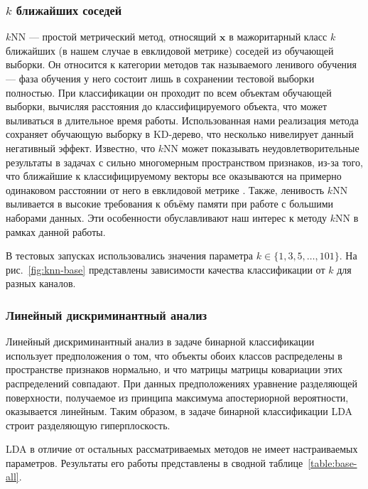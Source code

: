 \subsubsection{\(k\) ближайших соседей}
\(k\)NN --- простой метрический метод, относящий \(\mathbf{x}\) в мажоритарный класс \(k\) ближайших (в нашем случае в евклидовой метрике) соседей из обучающей выборки. Он относится к категории методов так называемого ленивого обучения --- фаза обучения у него состоит лишь в сохранении тестовой выборки полностью. При классификации он проходит по всем объектам обучающей выборки, вычисляя расстояния до классифицируемого объекта, что может выливаться в длительное время работы. Использованная нами реализация метода сохраняет обучающую выборку в KD-дерево, что несколько нивелирует данный негативный эффект. Известно, что \(k\)NN может показывать неудовлетворительные результаты в задачах с сильно многомерным пространством признаков, из-за того, что ближайшие к классифицируемому векторы все оказываются на примерно одинаковом расстоянии от него в евклидовой метрике \cite{beyer}. Также, ленивость \(k\)NN выливается в высокие требования к объёму памяти при работе с большими наборами данных. Эти особенности обуславливают наш интерес к методу \(k\)NN в рамках данной работы.

В тестовых запусках использовались значения параметра \(k\in\{1,3,5,\dotsc,101\}\). На рис.~\ref{fig:knn-base} представлены зависимости качества классификации от \(k\) для разных каналов.

\subsubsection{Линейный дискриминантный анализ}
Линейный дискриминантный анализ в задаче бинарной классификации использует предположения о том, что объекты обоих классов распределены в пространстве признаков нормально, и что матрицы матрицы ковариации этих распределений совпадают. При данных предположениях уравнение разделяющей поверхности, получаемое из принципа максимума апостериорной вероятности, оказывается линейным. Таким образом, в задаче бинарной классификации LDA строит разделяющую гиперплоскость.

LDA в отличие от остальных рассматриваемых методов не имеет настраиваемых параметров. Результаты его работы представлены в сводной таблице~\ref{table:base-all}.

